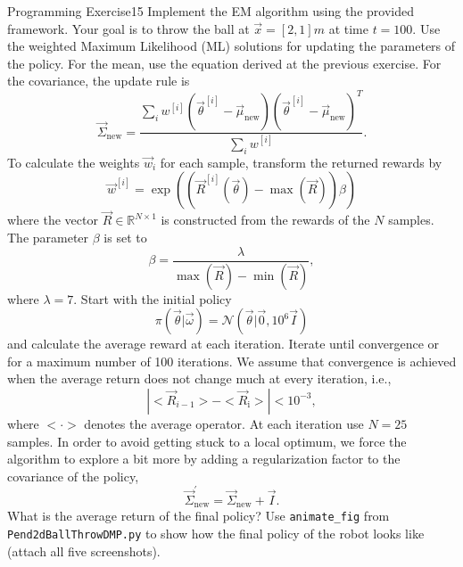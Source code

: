 \begin{questions}
\begin{question}{Programming Exercise}{15}
Implement the EM algorithm using the provided framework. Your goal is to throw the ball at $\vec x = [2,1]m$ at time $t=100$. Use the weighted Maximum Likelihood (ML) solutions for updating the parameters of the policy. For the mean, use the equation derived at the previous exercise. For the covariance, the update rule is 
\begin{equation}
	\vec \Sigma_\mathrm{new} = \frac{\sum_i w^{[i]} (\vec{\theta}^{[i]}-\vec{\mu}_{\mathrm{new}})     (\vec{\theta}^{[i]}-\vec{\mu}_{\mathrm{new}})^T}{\sum_i w^{[i]}}.
\end{equation}
To calculate the weights $\vec{w}_i$ for each sample, transform the returned rewards by 
\begin{equation}
	\vec w^{[i]} = \exp ( ( \vec{R}^{[i]}(\vec{\theta}) - \max(\vec{R}) ) \beta )
\end{equation}
where the vector $\vec R\in \mathbb{R}^{N \times 1}$ is constructed from the rewards of the $N$ samples. The
parameter $\beta$ is set to
\begin{equation}
	\beta = \frac{\lambda}{ \max(\vec{R}) - \min(\vec{R}) },
\end{equation}
where $\lambda = 7$. Start with the initial policy 
\begin{equation}
	\pi(\vec{\theta}|\vec{\omega}) = \mathcal{N}(\vec{\theta}|\vec{0}, 10^6  \vec{I})
\end{equation}
and calculate the average reward at each iteration. Iterate until convergence or for a maximum number of 100 iterations.
We assume that convergence is achieved when the average return does not change much at every iteration, i.e., 
$$ | <\vec{R}_{i-1}> - <\vec{R}_\textrm{i}> | < 10^{-3}, $$
where $<\cdot>$ denotes the average operator.
At each iteration use 
$ N = 25 $ samples. In order to avoid getting stuck to a local optimum, we force the algorithm to explore a bit more by adding a regularization factor to the covariance of the policy,
\begin{equation}
    \vec{\Sigma}_\mathrm{new}^\mathrm{'} = \vec{\Sigma}_\mathrm{new} + \vec{I}.
\end{equation}
What is the average return of the final policy? 
Use \texttt{animate\_fig} from \texttt{Pend2dBallThrowDMP.py} to show how the final policy of the robot looks like (attach all five screenshots).

\begin{answer}\end{answer}


\end{question}
\end{questions}
